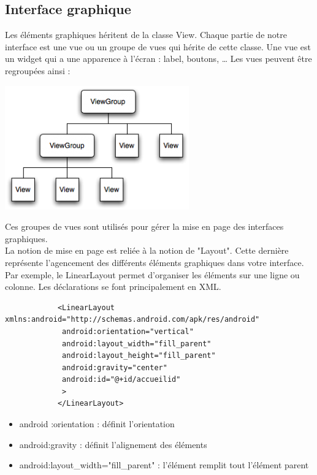 \documentclass[a4paper]{report}
\begin{document}
		\subsection{Interface graphique}
			Les éléments graphiques héritent de la classe View. Chaque partie de notre interface est une vue ou un groupe de vues qui hérite de cette classe. Une vue est un widget qui a une 				apparence à l’écran : label, boutons, … Les vues peuvent être regroupées ainsi :\\
			\begin{center}
				\includegraphics[scale=0.5]{Images/viewgroup.png}
			\end{center}
			Ces groupes de vues sont utilisés pour gérer la mise en page des interfaces graphiques.\\

			La notion de mise en page est reliée à la notion de "Layout". Cette dernière représente l'agencement des différents éléments graphiques dans votre interface. Par exemple, le 				LinearLayout permet d’organiser les éléments sur une ligne ou colonne. Les déclarations se font principalement en XML.\\
			\begin{verbatim}
			<LinearLayout xmlns:android="http://schemas.android.com/apk/res/android"
			 android:orientation="vertical"
			 android:layout_width="fill_parent"
			 android:layout_height="fill_parent"
			 android:gravity="center"
			 android:id="@+id/accueilid"
			 >
			</LinearLayout>
			\end{verbatim}
			\begin{itemize}
				\item android :orientation : définit l'orientation
	  			\item android:gravity : définit l'alignement des éléments
				\item android:layout\_width="fill\_parent" : l'élément remplit tout l'élément parent
			\end{itemize}
\end{document}
